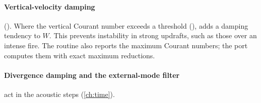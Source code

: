 \paragraph{Vertical-velocity damping} (). Where the vertical Courant number exceeds a threshold
(),  adds a damping tendency to $W$. This
prevents instability in strong updrafts, such as those over an intense fire. The routine also reports the maximum
Courant numbers; the port computes them with exact maximum reductions.

\paragraph{Divergence damping and the external-mode filter} act in the acoustic steps (\cref{ch:time}).
